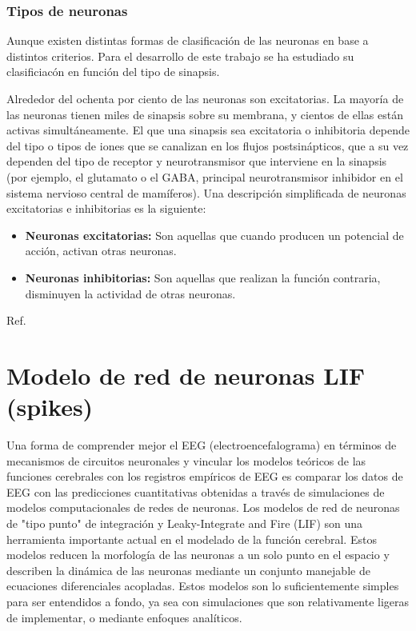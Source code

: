 \documentclass[oneside,openright,titlepage,numbers=noenddot,openany,headinclude,footinclude=true,
cleardoublepage=empty,abstractoff,BCOR=5mm,paper=a4,fontsize=12pt,main=spanish]{scrreprt}
\begin{document}
\subsection{Tipos de neuronas}\label{part:tiposneuronas}
Aunque existen distintas formas de clasificación de las neuronas en base a distintos criterios. Para el desarrollo de este trabajo se ha estudiado su clasificiacón en función del tipo de sinapsis.

Alrededor del ochenta por ciento de las neuronas son excitatorias. La mayoría de las neuronas tienen miles de sinapsis sobre su membrana, y cientos de ellas están activas simultáneamente. El que una sinapsis sea excitatoria o inhibitoria depende del tipo o tipos de iones que se canalizan en los flujos postsinápticos, que a su vez dependen del tipo de receptor y neurotransmisor que interviene en la sinapsis (por ejemplo, el glutamato o el GABA, principal neurotransmisor inhibidor en el sistema nervioso central de mamíferos). Una descripción simplificada de neuronas excitatorias e inhibitorias es la siguiente:

\begin{itemize}
    \item  \textbf{Neuronas excitatorias:} Son aquellas que cuando producen un potencial de acción, activan otras neuronas.

    \item \textbf{Neuronas inhibitorias:} Son aquellas que realizan la función contraria, disminuyen la actividad de otras neuronas.
\end{itemize}

Ref. \cite{tiposneuronas}

\chapter{Modelo de red de neuronas LIF (spikes)}\label{part:spikes}

Una forma de comprender mejor el EEG (electroencefalograma) en términos de mecanismos de circuitos neuronales y vincular los modelos teóricos de las funciones cerebrales con los registros empíricos de EEG es comparar los datos de EEG con las predicciones cuantitativas obtenidas a través de simulaciones de modelos computacionales de redes de neuronas. Los modelos de red de neuronas de "tipo punto" de integración y Leaky-Integrate and Fire (LIF) son una herramienta importante actual en el modelado de la función cerebral. Estos modelos reducen la morfología de las neuronas a un solo punto en el espacio y describen la dinámica de las neuronas mediante un conjunto manejable de ecuaciones diferenciales acopladas. Estos modelos son lo suficientemente simples para ser entendidos a fondo, ya sea con simulaciones que son relativamente ligeras de implementar, o mediante enfoques analíticos. 
\end{document}
